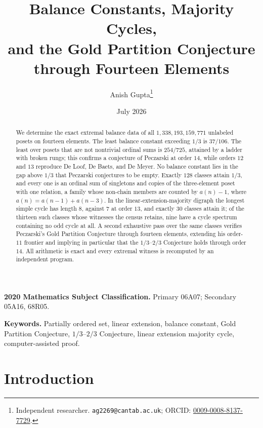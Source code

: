 \documentclass[11pt]{article}
\title{Balance Constants, Majority Cycles,\\
and the Gold Partition Conjecture\\
through Fourteen Elements}
\author{Anish Gupta\thanks{Independent researcher.
  \texttt{ag2269@cantab.ac.uk};
  ORCID: \href{https://orcid.org/0009-0008-8137-7729}
  {0009-0008-8137-7729}.}}
\date{July 2026}
\theoremstyle{definition}
\newcommand{\CEIGHT}{30}
\newcommand{\NEQUALITY}{128}
\begin{document}
\maketitle

\begin{abstract}
We determine the exact extremal balance data of all
$1{,}338{,}193{,}159{,}771$ unlabeled posets on fourteen elements.  The least
balance constant exceeding $1/3$ is $37/106$.  The least over posets that are
not nontrivial ordinal sums is $254/725$, attained by a ladder with broken
rungs; this confirms a conjecture of Peczarski at order $14$, while orders
$12$ and $13$ reproduce De Loof, De Baets, and De Meyer.  No balance constant
lies in the gap above $1/3$ that Peczarski conjectures to be empty.  Exactly
$\NEQUALITY$ classes attain $1/3$, and every one is an ordinal sum of
singletons and copies of the three-element poset with one relation, a family
whose non-chain members are counted by
$a(n)-1$, where $a(n)=a(n-1)+a(n-3)$.  In the
linear-extension-majority digraph the
longest simple cycle has length $8$, against $7$ at order $13$, and exactly
$\CEIGHT$ classes attain it; of the thirteen such classes whose witnesses the
census retains, nine have a cycle spectrum containing no odd cycle at all.  A
second exhaustive pass over
the same classes verifies Peczarski's Gold Partition Conjecture through
fourteen elements, extending his order-$11$ frontier and implying in
particular that the $1/3$--$2/3$ Conjecture holds through order $14$.  All
arithmetic is exact and every extremal witness is recomputed by an independent
program.
\end{abstract}

\noindent\textbf{2020 Mathematics Subject Classification.}
Primary 06A07; Secondary 05A16, 68R05.

\noindent\textbf{Keywords.}
Partially ordered set, linear extension, balance constant, Gold Partition
Conjecture, $1/3$--$2/3$ Conjecture, linear extension majority cycle,
computer-assisted proof.

\section{Introduction}
\end{document}
